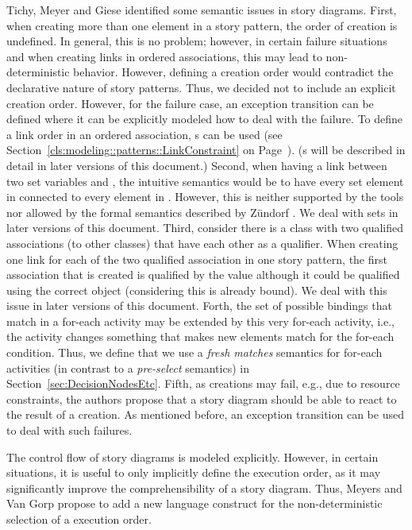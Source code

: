 Tichy, Meyer and Giese \cite{TMG06} identified some semantic issues in story diagrams.
First, when creating more than one element in a story pattern, the order of creation is undefined.
In general, this is no problem; however, in certain failure situations and when creating links in ordered associations, this may lead to non-deterministic behavior.
However, defining a creation order would contradict the declarative nature of story patterns.
Thus, we decided not to include an explicit creation order.
However, for the failure case, an exception transition can be defined where it can be explicitly modeled how to deal with the failure.
To define a link order in an ordered association, s can be used (see Section~\ref{cls:modeling::patterns::LinkConstraint} on Page~\pageref{cls:modeling::patterns::LinkConstraint}).
(s will be described in detail in later versions of this document.)
Second, when having a link between two set variables  and , the intuitive semantics would be to have every set element in  connected to every element in  .
However, this is neither supported by the tools nor allowed by the formal semantics described by Z\"{u}ndorf \cite{Zun01}.
We deal with sets in later versions of this document.
Third, consider there is a class with two qualified associations (to other classes) that have each other as a qualifier.
When creating one link for each of the two qualified association in one story pattern, the first association that is created is qualified by the  value although it could be qualified using the correct object (considering this is already bound).
We deal with this issue in later versions of this document.
Forth, the set of possible bindings that match in a for-each activity may be extended by this very for-each activity, i.e., the activity changes something that makes new elements match for the for-each condition.
Thus, we define that we use a \emph{fresh matches} semantics for for-each activities (in contrast to a \emph{pre-select} semantics) in Section~\ref{sec:DecisionNodesEtc}.
Fifth, as creations may fail, e.g., due to resource constraints, the authors propose that a story diagram should be able to react to the result of a creation.
As mentioned before, an exception transition can be used to deal with such failures.

The control flow of story diagrams is modeled explicitly.
However, in certain situations, it is useful to only implicitly define the execution order, as it may significantly improve the comprehensibility of a story diagram.
Thus, Meyers and Van Gorp \cite{MG08} propose to add a new language construct for the non-deterministic selection of a execution order.

